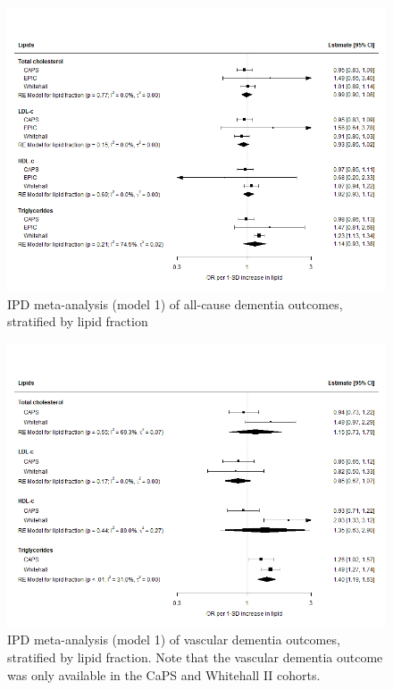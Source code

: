 \documentclass[a4paper, twoside]{templates/ociamthesis}
\begin{document}
\begin{figure}[H]
\includegraphics[width=1\linewidth]{figures/ipd/main_Dementia} \caption[IPD meta-analysis of all-cause dementia, stratified by lipid fraction]{IPD meta-analysis (model 1) of all-cause dementia outcomes, stratified by lipid fraction}\label{fig:mainEffectDem}
\end{figure}





\begin{figure}[H]
\includegraphics[width=1\linewidth]{figures/ipd/main_vasdem} \caption[IPD meta-analysis of all-cause dementia, stratified by lipid fraction]{IPD meta-analysis (model 1) of vascular dementia outcomes, stratified by lipid fraction. Note that the vascular dementia outcome was only available in the CaPS and Whitehall II cohorts.}\label{fig:mainEffectVad}
\end{figure}
\end{document}
